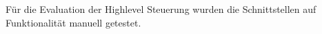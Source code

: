 Für die Evaluation der Highlevel Steuerung wurden die Schnittstellen auf Funktionalität manuell getestet.
